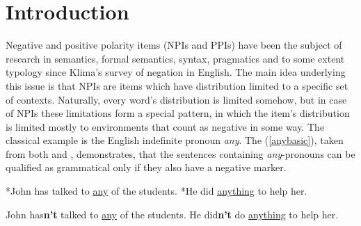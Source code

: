 \documentclass[a4paper,12pt]{article}
\begin{document}
	\newpage
	
	\tableofcontents
	\listoftables
	
	\newpage
	
	\section{Introduction}\label{introduction}
	
	Negative and positive polarity items (NPIs and PPIs) have been the subject of research in semantics, formal semantics, syntax, pragmatics and to some extent typology since Klima's survey of negation in English. The main idea underlying this issue is that NPIs are items which have distribution limited to a specific set of contexts. Naturally, every word's distribution is limited somehow, but in case of NPIs these limitations form a special pattern, in which the item's distribution is limited mostly to environments that count as negative in some way. The classical example is the English indefinite pronoun \textit{any}. The (\ref{anybasic}), taken from both \parencite{ladusaw1979} and \parencite{vanderwouden}, demonstrates, that the sentences containing \textit{any}-pronouns can be qualified as grammatical only if they also have a negative marker.
	
	\begin{exe}
		\ex \label{anybasic}
		\begin{xlist}
			\ex \label{anybasic1}
			*John has talked to \underline{any} of the students.
			\ex \label{anybasic2}
			*He did \underline{anything} to help her.
		\end{xlist} 
		\ex \label{anybasicneg}
		\begin{xlist}
			\ex \label{anybasicneg1}
			John has\textbf{n't} talked to \underline{any} of the students.
			\ex \label{anybasicneg2}
			He did\textbf{n't} do \underline{anything} to help her.
		\end{xlist}  
	\end{exe}
	
\end{document}
